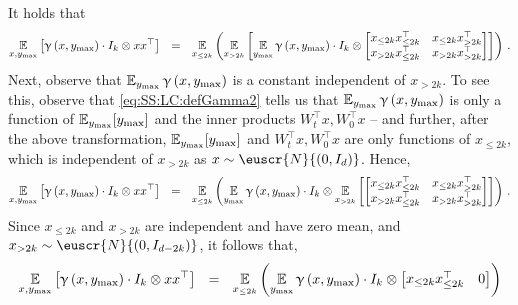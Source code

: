 \documentclass[11pt,letterpaper]{article}
\theoremstyle{plain}
\theoremstyle{definition}
\theoremstyle{remark}
\newcommand{\inparen}[1]{\ensuremath{\left(#1\right)}}
\newcommand{\insquare}[1]{\ensuremath{\left[#1\right]}}
\newcommand{\E}{\operatornamewithlimits{\mathbb{E}}}
\newcommand{\Ex}{\E}
\newcommand{\customcal}[1]{\euscr{#1}}
\newcommand{\cN}{\customcal{N}}
\renewcommand{\gamma}{\upgamma}
\newcommand{\normal}[2]{\cN{\inparen{#1,#2}}}
\newcommand{\ymax}{y_{\max}}
\begin{document}
{{    It holds that 
    \[
        \Ex_{x,\ymax}\insquare{
            \gamma\inparen{x,\ymax}\cdot I_{k}\otimes xx^\top
            }
        ~~=~~
        \Ex_{x_{\leq 2k}}
        \inparen{
            \Ex_{x_{> 2k}}\insquare{
                \Ex_{\ymax}{
                    \gamma\inparen{x,\ymax}
                }\cdot I_{k}\otimes 
                \begin{bmatrix}
                    x_{\leq 2k}x_{\leq 2k}^\top & x_{\leq 2k}x_{>2k}^\top\\
                    x_{>2k}x_{\leq 2k}^\top & x_{>2k} x_{>2k}^\top
                \end{bmatrix}
            }
        }\,.
    \]
    Next, observe that $\Ex_{\ymax}{
                    \gamma\inparen{x,\ymax}
                }$ is a constant independent of $x_{>2k}$. 
    To see this, observe that \cref{eq:SS:LC:defGamma2} tells us that $\Ex_{\ymax}{\gamma\inparen{x,\ymax}}$ is only a function of $\Ex_{\ymax}[\ymax]$ and the inner products $W_t^\top x,W_0^\top x$ -- and further, after the above transformation, $\Ex_{\ymax}[\ymax]$ and $W_t^\top x,W_0^\top x$ are only functions of $x_{\leq 2k}$, which is independent of $x_{>2k}$ as $x\sim \normal{0}{I_d}$.
    Hence,
    \begin{align*}
        \Ex_{x,\ymax}\insquare{
            \gamma\inparen{x,\ymax}\cdot I_{k}\otimes xx^\top
            }
        ~~=~~
        \Ex_{x_{\leq 2k}}
        \inparen{
            \Ex_{\ymax}{
                \gamma\inparen{x,\ymax}
            }\cdot I_{k}\otimes 
            \Ex_{x_{> 2k}}\insquare{
                \begin{bmatrix}
                    x_{\leq 2k}x_{\leq 2k}^\top & x_{\leq 2k}x_{>2k}^\top\\
                    x_{>2k}x_{\leq 2k}^\top & x_{>2k} x_{>2k}^\top
                \end{bmatrix}
            }
        }\,.
    \end{align*}
    Since $x_{\leq 2k}$ and $x_{>2k}$ are independent and have zero mean, and $x_{>2k}\sim \normal{0}{I_{d-2k}}$, it follows that,
    \[
        \Ex_{x,\ymax}\insquare{
            \gamma\inparen{x,\ymax}\cdot I_{k}\otimes xx^\top
            }
        ~~=~~
        \Ex_{x_{\leq 2k}}
        \inparen{
            {
                \Ex_{\ymax}{
                    \gamma\inparen{x,\ymax}
                }\cdot I_{k}\otimes 
                \begin{bmatrix}
                    x_{\leq 2k}x_{\leq 2k}^\top & 0\\

\end{bmatrix}}}\]}}
\end{document}
